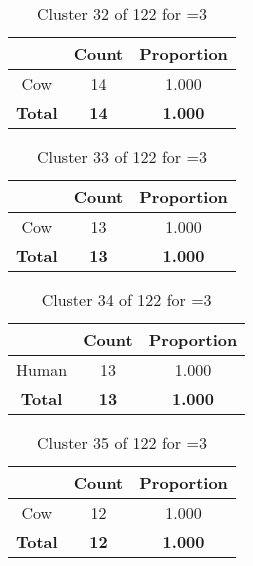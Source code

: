 \begin{table}[ht!]
\centering
\begin{tabular}{|c|c|c|}
\hline
\bf \Spec{} &\bf Count &\bf Proportion\\ \hline \hline
Cow & 14 & 1.000\\ \hline
\hline
\bf Total & \bf 14 & \bf 1.000\\ \hline
\end{tabular}
\label{tab:cluster:32:3}
\caption{Cluster 32 of 122 for \minneigh{}=3}
\end{table}

\begin{table}[ht!]
\centering
\begin{tabular}{|c|c|c|}
\hline
\bf \Spec{} &\bf Count &\bf Proportion\\ \hline \hline
Cow & 13 & 1.000\\ \hline
\hline
\bf Total & \bf 13 & \bf 1.000\\ \hline
\end{tabular}
\label{tab:cluster:33:3}
\caption{Cluster 33 of 122 for \minneigh{}=3}
\end{table}

\begin{table}[ht!]
\centering
\begin{tabular}{|c|c|c|}
\hline
\bf \Spec{} &\bf Count &\bf Proportion\\ \hline \hline
Human & 13 & 1.000\\ \hline
\hline
\bf Total & \bf 13 & \bf 1.000\\ \hline
\end{tabular}
\label{tab:cluster:34:3}
\caption{Cluster 34 of 122 for \minneigh{}=3}
\end{table}

\begin{table}[ht!]
\centering
\begin{tabular}{|c|c|c|}
\hline
\bf \Spec{} &\bf Count &\bf Proportion\\ \hline \hline
Cow & 12 & 1.000\\ \hline
\hline
\bf Total & \bf 12 & \bf 1.000\\ \hline
\end{tabular}
\label{tab:cluster:35:3}
\caption{Cluster 35 of 122 for \minneigh{}=3}
\end{table}

